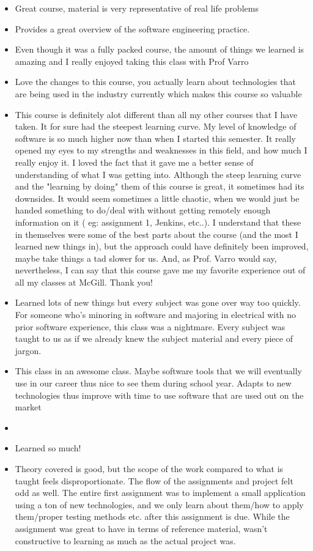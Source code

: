 \begin{itemize}
\item Great course, material is very representative of real life problems 
\item Provides a great overview of the software engineering practice. 
\item Even though it was a fully packed course, the amount of things we learned is amazing and I really enjoyed taking this class with Prof Varro 
\item Love the changes to this course, you actually learn about technologies that are being used in the industry currently which makes this course so valuable 
\item This course is definitely alot different than all my other courses that I have taken. It for sure had the steepest learning curve. My level of knowledge of software is so much higher now than when I started this semester. It really opened my eyes to my strengths and weaknesses in this field, and how much I really enjoy it. I loved the fact that it gave me a better sense of understanding of what I was getting into. Although the steep learning curve and the "learning by doing" them of this course is great, it sometimes had its downsides. It would seem sometimes a little chaotic, when we would just be handed something to do/deal with without getting remotely enough information on it ( eg: assignment 1, Jenkins, etc..). I understand that these in themselves were some of the best parts about the course (and the most I learned new things in), but the approach could have definitely been improved, maybe take things a tad slower for us. And, as Prof. Varro would say, nevertheless, I can say that this course gave me my favorite experience out of all my classes at McGill. Thank you! 
\item Learned lots of new things but every subject was gone over way too quickly. For someone who's minoring in software and majoring in electrical with no prior software experience, this class was a nightmare. Every subject was taught to us as if we already knew the subject material and every piece of jargon. 
\item This class in an awesome class. Maybe software tools that we will eventually use in our career thus nice to see them during school year. Adapts to new technologies thus improve with time to use software that are used out on the market 
\item 
\item Learned so much! 
\item Theory covered is good, but the scope of the work compared to what is taught feels disproportionate. The flow of the assignments and project felt odd as well. The entire first assignment was to implement a small application using a ton of new technologies, and we only learn about them/how to apply them/proper testing methods etc. after this assignment is due. While the assignment was great to have in terms of reference material, wasn't constructive to learning as much as the actual project was. 

\end{itemize}
